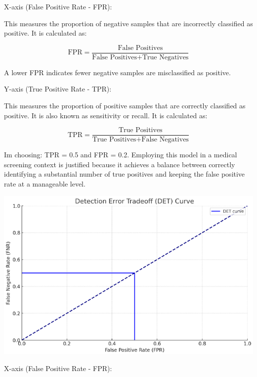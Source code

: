 \documentclass[12pt]{article}
\begin{document}
\begin{enumerate}
X-axis (False Positive Rate - FPR):

This measures the proportion of negative samples that are incorrectly classified as positive. It is calculated as:

\[
\text{FPR} = \frac{\text{False Positives}}{\text{False Positives} + \text{True Negatives}}
\]

A lower FPR indicates fewer negative samples are misclassified as positive.

Y-axis (True Positive Rate - TPR):

This measures the proportion of positive samples that are correctly classified as positive. It is also known as sensitivity or recall. It is calculated as:

\[
\text{TPR} = \frac{\text{True Positives}}{\text{True Positives} + \text{False Negatives}}
\]


Im choosing: TPR = 0.5 and FPR = 0.2. Employing this model in a medical screening context is justified because it achieves a balance between correctly identifying a substantial number of true positives and keeping the false positive rate at a manageable level.



\includegraphics[scale=0.8]{hw05graph2.png}

X-axis (False Positive Rate - FPR):


\end{enumerate}
\end{document}
